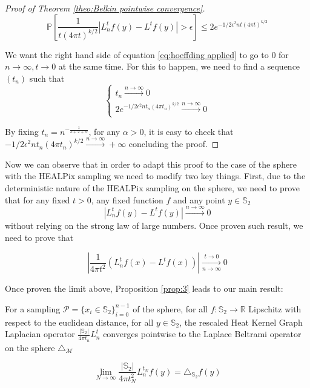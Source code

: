 \begin{proof}[Proof of Theorem \ref{theo:Belkin pointwise convergence}]
\begin{equation}
	\label{eq:hoeffding applied}
	\mathbb{P}\left[\frac{1}{t(4 \pi t)^{k / 2}}\left|L_{n}^{t} f(y)- L^{t} f(y)\right|>\epsilon\right] \leq 2 e^{-1 / 2 \epsilon^{2} n t(4 \pi t)^{k / 2}}
\end{equation}

We want the right hand side of equation \ref{eq:hoeffding applied} to go to $0$ for $n\to\infty, t\to0$ at the same time. For this to happen, we need to find a sequence $(t_n)$ such that 
$$\begin{cases}
t_n\xrightarrow{n\to\infty}0\\
2 e^{-1 / 2 \epsilon^{2} n t_n(4 \pi t_n)^{k / 2}}\xrightarrow{n\to\infty}0\\
\end{cases}$$

By fixing $t_n=n^{-\frac{1}{k+2+\alpha}}$, for any $\alpha>0$, it is easy to check that $-1 / 2 \epsilon^{2} n t_n(4 \pi t_n)^{k / 2}\xrightarrow{n\to\infty}+\infty$ concluding the proof.

\end{proof}

Now we can observe that in order to adapt this proof to the case of the sphere with the HEALPix sampling  we need to modify two key things. First, due to the deterministic nature of the HEALPix sampling on the sphere, we need to prove that for any fixed $t>0$, any fixed function $f$ and any point $y\in\mathbb S_2$ 
$$\left|L_n^tf(y)-L^tf(y)\right|\xrightarrow{n\to \infty} 0$$
without relying on the strong law of large numbers. Once proven such result, we need to prove that

$$\left|\frac{1}{4\pi t^2}\left(L_n^tf(x) - L^tf(x)\right)\right|\xrightarrow[n\to \infty]{t\to 0}0$$

Once proven the limit above, Proposition \ref{prop:3} leads to our main result:
\vspace{1cm}
\begin{theorem}
	For a sampling $\mathcal P = \{x_i\in\mathbb S_2\}_{i=0}^{n-1}$ of the sphere, for all $f: \mathbb S_2 \rightarrow \mathbb R$ Lipschitz with respect to the euclidean distance, for all $y\in\mathbb S_2$, the rescaled Heat Kernel Graph Laplacian operator $\frac{|\mathbb S_2|}{4\pi t_n}L^t_n$ converges pointwise to the Laplace Beltrami operator on the sphere $\triangle_{\mathcal M}$
	
	$$ \lim_{N\to\infty}\frac{|\mathbb S_2|}{4\pi t_N^2} L_n^{t_N}f(y) =  \triangle_{\mathbb S_2}f(y) $$
	\label{theo:pointwise convergence in the healpix case}
\end{theorem}
\vspace{1cm}

